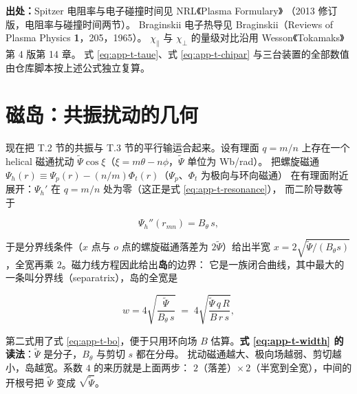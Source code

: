 {\footnotesize
\textbf{出处：}Spitzer 电阻率与电子碰撞时间见 NRL《Plasma Formulary》
（2013 修订版，电阻率与碰撞时间两节）。
Braginskii 电子热导见
Braginskii（Reviews of Plasma Physics \textbf{1}，205，1965）。
$\chi_\parallel$ 与 $\chi_\perp$ 的量级对比沿用 Wesson《Tokamaks》第 4 版第 14 章。
式 \eqref{eq:app-t-taue}、式 \eqref{eq:app-t-chipar} 与三台装置的全部数值
由仓库脚本按上述公式独立复算。
}

\section{磁岛：共振扰动的几何}
\label{sec:app-t-island}

现在把 T.2 节的共振与 T.3 节的平行输运合起来。设有理面 $q=m/n$ 上存在一个 helical
磁通扰动 $\tilde\Psi\cos\xi$（$\xi=m\theta-n\phi$，$\tilde\Psi$ 单位为 Wb/rad）。
把螺旋磁通 $\Psi_h(r)\equiv\Psi_p(r)-(n/m)\Phi_t(r)$（$\Psi_p$、$\Phi_t$ 为极向与环向磁通）
在有理面附近展开：$\Psi_h'$ 在 $q=m/n$ 处为零（这正是式 \eqref{eq:app-t-resonance}），
而二阶导数等于

\begin{equation}
\Psi_h''(r_{mn})=B_\theta\,s ,
\label{eq:app-t-psih}
\end{equation}

于是分界线条件（$x$ 点与 $o$ 点的螺旋磁通落差为 $2\tilde\Psi$）给出半宽
$x=2\sqrt{\tilde\Psi/(B_\theta s)}$，全宽再乘 $2$。磁力线方程因此给出\textbf{岛}的边界：
它是一族闭合曲线，其中最大的一条叫分界线（separatrix），岛的全宽是

\begin{equation}
w=4\sqrt{\frac{\tilde\Psi}{B_\theta\,s}}
\;=\;4\sqrt{\frac{\tilde\Psi\,q\,R}{B\,r\,s}},
\label{eq:app-t-width}
\end{equation}

第二式用了式 \eqref{eq:app-t-bo}，便于只用环向场 $B$ 估算。\textbf{式
\eqref{eq:app-t-width} 的读法}：$\tilde\Psi$ 是分子，$B_\theta$ 与剪切 $s$ 都在分母。
扰动磁通越大、极向场越弱、剪切越小，岛越宽。系数 $4$ 的来历就是上面两步：
$2$（落差）$\times\,2$（半宽到全宽），中间的开根号把 $\tilde\Psi$ 变成 $\sqrt{\tilde\Psi}$。

